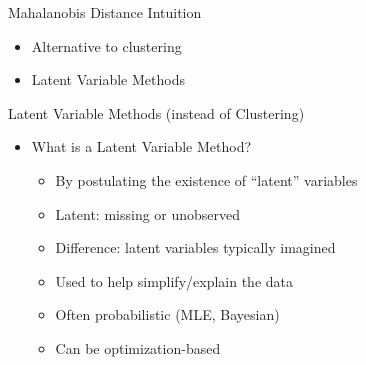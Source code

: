\documentclass[aspectratio=169]{beamer}
\begin{document}
%
%
\begin{frame}{Mahalanobis Distance Intuition}
\begin{itemize}
\item Alternative to clustering
\item Latent Variable Methods
\end{itemize}
\end{frame}
\begin{frame}{Latent Variable Methods (instead of Clustering)}

\begin{itemize}
\item What is a Latent Variable Method?
	\begin{itemize}
	\item By postulating the existence of ``latent'' variables
	\item Latent: missing or unobserved %
	\item Difference: latent variables typically imagined
	\item Used to help simplify/explain the data
	\item Often probabilistic (MLE, Bayesian)
	\item Can be optimization-based
	\end{itemize}
\end{itemize}

\end{frame}
\end{document}
